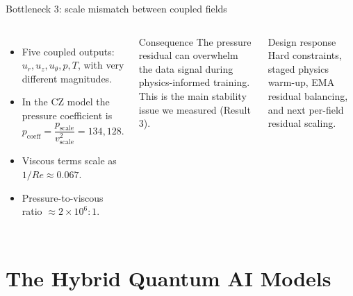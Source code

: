 \documentclass[aspectratio=169,10pt]{beamer}
\begin{document}
\begin{frame}{Bottleneck 3: scale mismatch between coupled fields}
\begin{columns}[T,onlytextwidth]
\begin{itemize}
  \item Five coupled outputs: $u_r, u_z, u_\theta, p, T$, with very different magnitudes.
  \item In the CZ model the pressure coefficient is
  \[p_{\mathrm{coeff}} = \frac{p_{\mathrm{scale}}}{v_{\mathrm{scale}}^2} = 134{,}128.\]
  \item Viscous terms scale as $1/Re \approx 0.067$.
  \item Pressure-to-viscous ratio $\approx 2\times10^{6}:1$.
\end{itemize}
\begin{alertblock}{Consequence}
The pressure residual can overwhelm the data signal during physics-informed training. This is the main stability issue we measured (Result 3).
\end{alertblock}
\vspace{0.2cm}
\begin{block}{Design response}
Hard constraints, staged physics warm-up, EMA residual balancing, and next per-field residual scaling.
\end{block}
\end{columns}
\end{frame}

\section{The Hybrid Quantum AI Models}
\end{document}
